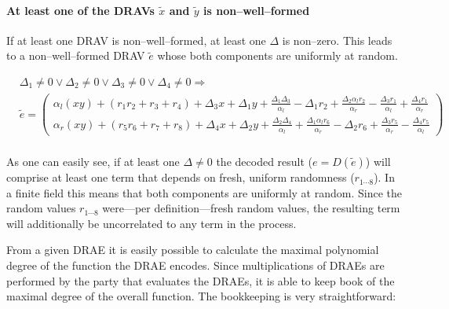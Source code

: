 \paragraph{At least one of the DRAVs $\widetilde{x}$ and $\widetilde{y}$ is
non--well--formed} If at least one DRAV is non--well--formed, at least one
$\Delta$ is non--zero. This leads to a non--well--formed DRAV $\widetilde{e}$
whose both components are uniformly at random.

\begin{align*}
  &
  \Delta_1 \neq 0 \vee \Delta_2 \neq 0 \vee
  \Delta_3 \neq 0 \vee \Delta_4 \neq 0
  \Rightarrow \\
  &
  \widetilde{e} =
  \begin{pmatrix}
    \alpha_l(xy) + (r_1r_2 + r_3 + r_4)
    + \Delta_3x + \Delta_1y
    + \frac{\Delta_1\Delta_3}{\alpha_l}
    - \Delta_1r_2
    + \frac{\Delta_2\alpha_lr_2}{\alpha_r}
    - \frac{\Delta_3r_1}{\alpha_l}
    + \frac{\Delta_4r_1}{\alpha_r}
    \\
    \alpha_r(xy) + (r_5r_6 + r_7 + r_8)
    + \Delta_4x + \Delta_2y
    + \frac{\Delta_2\Delta_4}{\alpha_l}
    + \frac{\Delta_1\alpha_lr_6}{\alpha_r}
    - \Delta_2r_6
    + \frac{\Delta_3r_5}{\alpha_r}
    - \frac{\Delta_4r_5}{\alpha_l}
  \end{pmatrix} \\
\end{align*}

\noindent{}As one can easily see, if at least one $\Delta \neq 0$ the decoded
result ($e = D(\widetilde{e})$) will comprise at least one term that depends on
fresh, uniform randomness ($r_{1 \cdots 8}$). In a finite field this means that
both components are uniformly at random. Since the random values $r_{1 \cdots
8}$ were---per definition---fresh random values, the resulting term will
additionally be uncorrelated to any term in the process.


\label{sec:max-poly-degree}

From a given DRAE it is easily possible to calculate the maximal polynomial
degree of the function the DRAE encodes. Since multiplications of DRAEs are
performed by the party that evaluates the DRAEs, it is able to keep book of the
maximal degree of the overall function. The bookkeeping is very straightforward:

